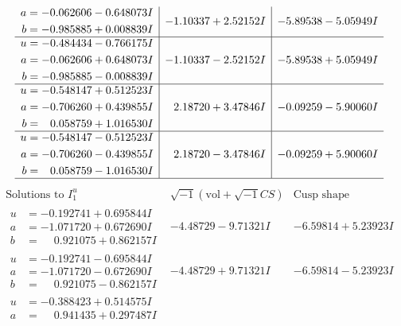 \documentclass[1p]{elsarticle_modified}
\theoremstyle{definition}
\newcommand{\I}{\sqrt{-1}}
\begin{document}
$$\begin{array}{c|c|c}
\begin{aligned}
a &= -0.062606 - 0.648073 I \\
b &= -0.985885 + 0.008839 I\end{aligned}
 & -1.10337 + 2.52152 I & -5.89538 - 5.05949 I \\ \hline\begin{aligned}
u &= -0.484434 - 0.766175 I \\
a &= -0.062606 + 0.648073 I \\
b &= -0.985885 - 0.008839 I\end{aligned}
 & -1.10337 - 2.52152 I & -5.89538 + 5.05949 I \\ \hline\begin{aligned}
u &= -0.548147 + 0.512523 I \\
a &= -0.706260 + 0.439855 I \\
b &= \phantom{-}0.058759 + 1.016530 I\end{aligned}
 & \phantom{-}2.18720 + 3.47846 I & -0.09259 - 5.90060 I \\ \hline\begin{aligned}
u &= -0.548147 - 0.512523 I \\
a &= -0.706260 - 0.439855 I \\
b &= \phantom{-}0.058759 - 1.016530 I\end{aligned}
 & \phantom{-}2.18720 - 3.47846 I & -0.09259 + 5.90060 I\\
 \hline 
 \end{array}$$\newpage$$\begin{array}{c|c|c}  
\text{Solutions to }I^u_{1}& \I (\text{vol} + \sqrt{-1}CS) & \text{Cusp shape}\\
 \hline 
\begin{aligned}
u &= -0.192741 + 0.695844 I \\
a &= -1.071720 + 0.672690 I \\
b &= \phantom{-}0.921075 + 0.862157 I\end{aligned}
 & -4.48729 - 9.71321 I & -6.59814 + 5.23923 I \\ \hline\begin{aligned}
u &= -0.192741 - 0.695844 I \\
a &= -1.071720 - 0.672690 I \\
b &= \phantom{-}0.921075 - 0.862157 I\end{aligned}
 & -4.48729 + 9.71321 I & -6.59814 - 5.23923 I \\ \hline\begin{aligned}
u &= -0.388423 + 0.514575 I \\
a &= \phantom{-}0.941435 + 0.297487 I \\

\end{aligned}
\end{array}$$
\end{document}
